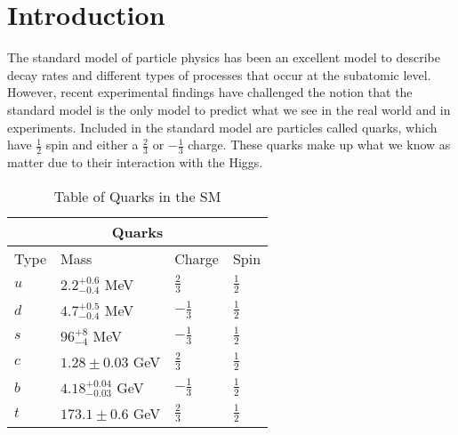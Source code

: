 \documentclass[12pt]{article}
\def \[{\left[}
\begin{document}
\section{Introduction}
The standard model of particle physics has been an excellent model to describe decay rates and different types of processes that occur at the subatomic level. However, recent experimental findings have challenged the notion that the standard model is the only model to predict what we see in the real world and in experiments. Included in the standard model are particles called quarks, which have $\frac{1}{2}$ spin and either a $\frac{2}{3}$ or $-\frac{1}{3}$ charge. These quarks make up what we know as matter due to their interaction with the Higgs. 
\begin{table}[h!]
\centering
\begin{tabular}{ |p{3cm}||p{3cm}|p{3cm}|p{3cm}|  }
 \hline
 \multicolumn{4}{|c|}{Quarks} \\
 \hline
 Type & Mass & Charge & Spin\\
 \hline
 $u$ & $2.2 ^{+0.6}_{\num{-0.4}}$ MeV & $\frac{2}{3}$ & $\frac{1}{2}$\\ [1ex]
 $d$ &  $4.7 ^{+0.5}_{\num{-0.4}}$ MeV & $-\frac{1}{3}$   & $\frac{1}{2}$\\ [1ex]
 $s$ &$96 ^{+8}_{\num{-4}}$ MeV & $-\frac{1}{3}$ & $\frac{1}{2}$\\[1ex]
 $c$ & $1.28 \pm 0.03$ GeV &$\frac{2}{3}$ & $\frac{1}{2}$\\[1ex]
 $b$ & $4.18 ^{+0.04}_{\num{-0.03}}$ GeV  &$-\frac{1}{3}$ & $\frac{1}{2}$\\[1ex]
 $t$ & $173.1 \pm 0.6$ GeV &$\frac{2}{3}$ & $\frac{1}{2}$\\[1ex]
 \hline 
\end{tabular}
\caption{Table of Quarks in the SM \cite{Agashe:2014kda}}
\label{table:1}
\end{table}\\
\end{document}
